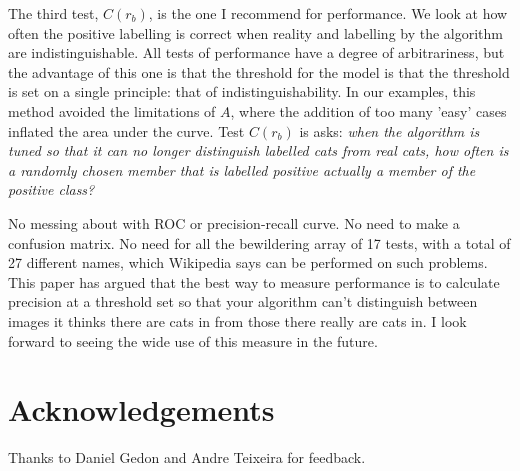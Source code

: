 \documentclass[preprint,12pt]{article}
\begin{document}
The third test, $C(r_b)$, is the one I recommend for performance. We look at how often the positive labelling is correct when reality and labelling by the algorithm are indistinguishable. All tests of performance have a degree of arbitrariness, but the advantage of this one is that the threshold for the model is that the threshold is set on a single principle: that of indistinguishability. In our examples, this method avoided the limitations of $A$, where the addition of too many 'easy' cases inflated the area under the curve. Test $C(r_b)$ is asks: {\it when the algorithm is tuned so that it can no longer distinguish labelled cats from real cats, how often is a randomly chosen member that is labelled positive actually a member of the positive class?} 

No messing about with ROC or precision-recall curve. No need to make a confusion matrix. No need for all the bewildering array of 17 tests, with a total of 27 different names, which Wikipedia says can be performed on such problems. This paper has argued that the best way to measure performance is to calculate precision at a threshold set so that your algorithm can't distinguish between images it thinks there are cats in from those there really are cats in.  I look forward to seeing the wide use of this measure in the future. 

\section{Acknowledgements}

Thanks to Daniel Gedon and Andre Teixeira for feedback. 




\end{document}
